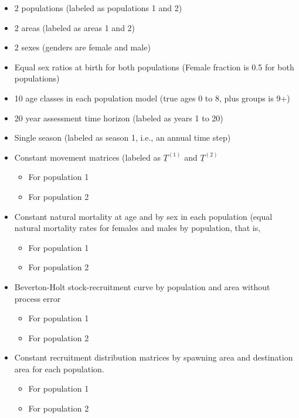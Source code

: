 \documentclass[12pt]{article}
\begin{document}
\begin{itemize}
	\item 2 populations (labeled as populations 1 and 2)

	\item 2 areas (labeled as areas 1 and 2)

	\item 2 sexes (genders are female and male)

	\item Equal sex ratios at birth for both populations (Female fraction is 0.5 for both populations)

	\item 10 age classes in each population model (true ages 0 to 8, plus groups is 9+)

	\item 20 year assessment time horizon (labeled as years 1 to 20)

	\item Single season (labeled as season 1, i.e., an annual time step)

	\item Constant movement matrices (labeled as $\underline{T}^{(1)}$ and  $\underline{T}^{(2)}$
	\begin{itemize}
		\item For population 1
		\item For population 2
	\end{itemize}

	\item Constant natural mortality at age and by sex in each population (equal natural mortality rates for females and males by population,  that is,
	\begin{itemize}
		\item For population 1
		\item For population 2
	\end{itemize}

	\item Beverton-Holt stock-recruitment curve by population and area without process error
	\begin{itemize}
		\item For population 1
		\item For population 2
	\end{itemize}

	\item Constant recruitment distribution matrices by spawning area and destination area for each population. 
	\begin{itemize}
		\item For population 1
		\item For population 2
	\end{itemize}


\end{itemize}
\end{document}
